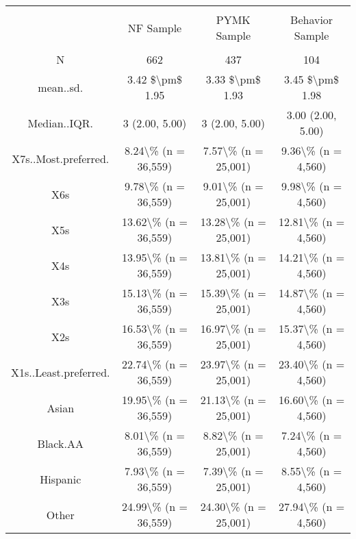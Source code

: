 
\begin{table}[!htbp] \centering 
  \caption{} 
  \label{} 
\begin{tabular}{@{\extracolsep{5pt}} cccc} 
\\[-1.8ex]\hline 
\hline \\[-1.8ex] 
 & NF Sample & PYMK Sample & Behavior Sample \\ 
\hline \\[-1.8ex] 
N & 662 & 437 & 104 \\ 
mean..sd. & 3.42 \$\textbackslash pm\$ 1.95 & 3.33 \$\textbackslash pm\$ 1.93 & 3.45 \$\textbackslash pm\$ 1.98 \\ 
Median..IQR. & 3 (2.00, 5.00) & 3 (2.00, 5.00) & 3.00 (2.00, 5.00) \\ 
X7s..Most.preferred. & 8.24\textbackslash \% (n = 36,559) & 7.57\textbackslash \% (n = 25,001) & 9.36\textbackslash \% (n = 4,560) \\ 
X6s & 9.78\textbackslash \% (n = 36,559) & 9.01\textbackslash \% (n = 25,001) & 9.98\textbackslash \% (n = 4,560) \\ 
X5s & 13.62\textbackslash \% (n = 36,559) & 13.28\textbackslash \% (n = 25,001) & 12.81\textbackslash \% (n = 4,560) \\ 
X4s & 13.95\textbackslash \% (n = 36,559) & 13.81\textbackslash \% (n = 25,001) & 14.21\textbackslash \% (n = 4,560) \\ 
X3s & 15.13\textbackslash \% (n = 36,559) & 15.39\textbackslash \% (n = 25,001) & 14.87\textbackslash \% (n = 4,560) \\ 
X2s & 16.53\textbackslash \% (n = 36,559) & 16.97\textbackslash \% (n = 25,001) & 15.37\textbackslash \% (n = 4,560) \\ 
X1s..Least.preferred. & 22.74\textbackslash \% (n = 36,559) & 23.97\textbackslash \% (n = 25,001) & 23.40\textbackslash \% (n = 4,560) \\ 
Asian & 19.95\textbackslash \% (n = 36,559) & 21.13\textbackslash \% (n = 25,001) & 16.60\textbackslash \% (n = 4,560) \\ 
Black.AA & 8.01\textbackslash \% (n = 36,559) & 8.82\textbackslash \% (n = 25,001) & 7.24\textbackslash \% (n = 4,560) \\ 
Hispanic & 7.93\textbackslash \% (n = 36,559) & 7.39\textbackslash \% (n = 25,001) & 8.55\textbackslash \% (n = 4,560) \\ 
Other & 24.99\textbackslash \% (n = 36,559) & 24.30\textbackslash \% (n = 25,001) & 27.94\textbackslash \% (n = 4,560) \\ 

\end{tabular}
\end{table}
